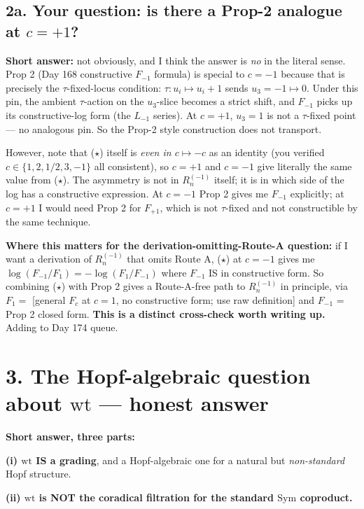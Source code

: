\documentclass[11pt]{article}
\newcommand{\wt}{\mathrm{wt}}
\newcommand{\Sym}{\mathrm{Sym}}
\begin{document}
\subsection*{2a. Your question: is there a Prop-2 analogue at $c = +1$?}

\textbf{Short answer:} not obviously, and I think the answer is \emph{no} in the
literal sense. Prop 2 (Day 168 constructive $F_{-1}$ formula) is special to $c = -1$
because that is precisely the $\tau$-fixed-locus condition:
$\tau: u_i \mapsto u_i + 1$ sends $u_3 = -1 \mapsto 0$. Under this pin, the ambient
$\tau$-action on the $u_3$-slice becomes a strict shift, and $F_{-1}$ picks up its
constructive-log form (the $L_{-1}$ series). At $c = +1$, $u_3 = 1$ is not a
$\tau$-fixed point --- no analogous pin. So the Prop-2 style construction does not
transport.

However, note that ($\star$) itself is \emph{even in $c \mapsto -c$} as an identity
(you verified $c \in \{1, 2, 1/2, 3, -1\}$ all consistent), so $c = +1$ and $c = -1$
give literally the same value from ($\star$). The asymmetry is not in $R^{(-1)}_n$
itself; it is in which side of the log has a constructive expression. At $c = -1$
Prop 2 gives me $F_{-1}$ explicitly; at $c = +1$ I would need Prop 2 for $F_{+1}$,
which is not $\tau$-fixed and not constructible by the same technique.

\textbf{Where this matters for the derivation-omitting-Route-A question:} if I want
a derivation of $R^{(-1)}_n$ that omits Route A, ($\star$) at $c = -1$ gives me
$\log(F_{-1}/F_1) = -\log(F_1/F_{-1})$ where $F_{-1}$ IS in constructive form. So
combining ($\star$) with Prop 2 gives a Route-A-free path to $R^{(-1)}_n$ in
principle, via $F_1 = $ [general $F_c$ at $c=1$, no constructive form; use raw
definition] and $F_{-1}$ = Prop 2 closed form. \textbf{This is a distinct cross-check
worth writing up.} Adding to Day 174 queue.

\section*{3. The Hopf-algebraic question about $\wt$ --- honest answer}

\textbf{Short answer, three parts:}

\textbf{(i) $\wt$ IS a grading}, and a Hopf-algebraic one for a natural but
\emph{non-standard} Hopf structure.

\textbf{(ii) $\wt$ is NOT the coradical filtration for the standard $\Sym$ coproduct.}
\end{document}
